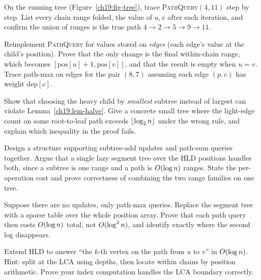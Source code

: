 \begin{exercise}
On the running tree (Figure~\ref{ch19:fig-tree}), trace \textsc{PathQuery}$(4,11)$ step by step. List
every chain range folded, the value of $u,v$ after each iteration, and confirm the union of ranges is
the true path $4\!\to\!2\!\to\!5\!\to\!9\!\to\!11$.
\end{exercise}

\begin{exercise}
Reimplement \textsc{PathQuery} for values stored on \emph{edges} (each edge's value at the child's
position). Prove that the only change is the final within-chain range, which becomes
$[\mathrm{pos}[u]+1,\mathrm{pos}[v]]$, and that the result is empty when $u=v$. Trace path-max on edges
for the pair $(8,7)$ assuming each edge $(p,c)$ has weight $\mathrm{dep}[c]$.
\end{exercise}

\begin{exercise}
Show that choosing the heavy child by \emph{smallest} subtree instead of largest can violate
Lemma~\ref{ch19:lem-halve}. Give a concrete small tree where the light-edge count on some root-to-leaf
path exceeds $\lfloor\log_2 n\rfloor$ under the wrong rule, and explain which inequality in the proof fails.
\end{exercise}

\begin{exercise}
Design a structure supporting subtree-add updates and path-sum queries together. Argue that a single
lazy segment tree over the HLD positions handles both, since a subtree is one range and a path is
$O(\log n)$ ranges. State the per-operation cost and prove correctness of combining the two range
families on one tree.
\end{exercise}

\begin{exercise}
Suppose there are no updates, only path-max queries. Replace the segment tree with a sparse table over
the whole position array. Prove that each path query then costs $O(\log n)$ total, not
$O(\log^2 n)$, and identify exactly where the second log disappears.
\end{exercise}

\begin{exercise}
Extend HLD to answer ``the $k$-th vertex on the path from $u$ to $v$'' in $O(\log n)$. Hint: split at
the LCA using depths, then locate within chains by position arithmetic. Prove your index computation
handles the LCA boundary correctly.
\end{exercise}

